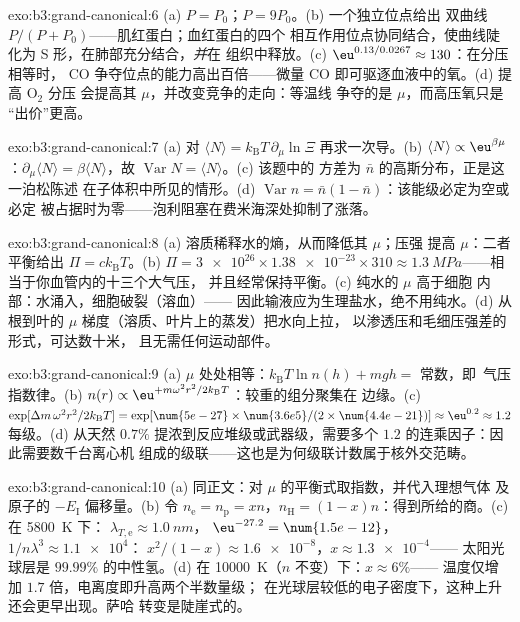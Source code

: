 \begin{solution}{exo:b3:grand-canonical:6}
(a) $P = P_0$；$P = 9P_0$。(b) 一个独立位点给出
双曲线 $P/(P + P_0)$——肌红蛋白；血红蛋白的四个
相互作用位点协同结合，使曲线陡化为
S 形，在肺部充分结合，\emph{并}在
组织中释放。(c) $\eu^{0.13/0.0267} \approx 130$：在分压相等时，
CO 争夺位点的能力高出百倍——微量 CO
即可驱逐血液中的氧。(d) 提高 O$_2$ 分压
会提高其 $\mu$，并改变竞争的走向：等温线
争夺的是 $\mu$，而高压氧只是
“出价”更高。
\end{solution}

\begin{solution}{exo:b3:grand-canonical:7}
(a) 对 $\langle N\rangle = k_{\text{B}}T\,\partial_\mu
\ln\Xi$ 再求一次导。(b) $\langle N\rangle \propto
\eu^{\beta\mu}$：$\partial_\mu\langle N\rangle = \beta\langle
N\rangle$，故 $\operatorname{Var}N = \langle N\rangle$。(c) 该题中的
方差为 $\bar n$ 的高斯分布，正是这一泊松陈述
在子体积中所见的情形。(d) $\operatorname{Var}n =
\bar n(1 - \bar n)$：该能级必定为空或必定
被占据时为零——泡利阻塞在费米海深处抑制了涨落。
\end{solution}

\begin{solution}{exo:b3:grand-canonical:8}
(a) 溶质稀释水的熵，从而降低其 $\mu$；压强
提高 $\mu$：二者平衡给出 $\Pi = ck_{\text{B}}T$。(b) $\Pi =
\num{3e26} \times \num{1.38e-23} \times 310 \approx
\qty{1.3}{MPa}$——相当于你血管内的十三个大气压，
并且经常保持平衡。(c) 纯水的 $\mu$ 高于细胞
内部：水涌入，细胞破裂（溶血）——
因此输液应为生理盐水，绝不用纯水。(d) 从根到叶的
$\mu$ 梯度（溶质、叶片上的蒸发）把水向上拉，
以渗透压和毛细压强差的形式，可达数十米，
且无需任何运动部件。
\end{solution}

\begin{solution}{exo:b3:grand-canonical:9}
(a) $\mu$ 处处相等：$k_{\text{B}}T\ln n(h) + mgh = $ 常数，即\
气压指数律。(b) $n(r) \propto
\eu^{+m\omega^2r^2/2k_{\text{B}}T}$：较重的组分聚集在
边缘。(c) $\exp[\Delta m\,\omega^2r^2/2k_{\text{B}}T] =
\exp[\num{5e-27} \times \num{3.6e5}/(2 \times \num{4.4e-21})]
\approx \eu^{0.2} \approx 1.2$ 每级。(d) 从天然
$0.7\%$ 提浓到反应堆级或武器级，需要多个
$1.2$ 的连乘因子：因此需要数千台离心机
组成的级联——这也是为何级联计数属于核外交范畴。
\end{solution}

\begin{solution}{exo:b3:grand-canonical:10}
(a) 同正文：对 $\mu$ 的平衡式取指数，并代入理想气体
及原子的 $-E_{\text{I}}$ 偏移量。(b)
令 $n_{\text{e}} = n_{\text{p}} = xn$，$n_{\text{H}} =
(1-x)n$：得到所给的商。(c) 在 \qty{5800}{K} 下：
$\lambda_{T,\text{e}} \approx \qty{1.0}{nm}$，
$\eu^{-27.2} = \num{1.5e-12}$，$1/n\lambda^3 \approx \num{1.1e4}$：
$x^2/(1-x) \approx \num{1.6e-8}$，$x \approx \num{1.3e-4}$——
太阳光球层是 $99.99\%$ 的中性氢。(d) 在
\qty{10000}{K}（$n$ 不变）下：$x \approx 6\%$——
温度仅增加 $1.7$ 倍，电离度即升高两个半数量级；
在光球层较低的电子密度下，这种上升还会更早出现。萨哈
转变是陡崖式的。
\end{solution}

